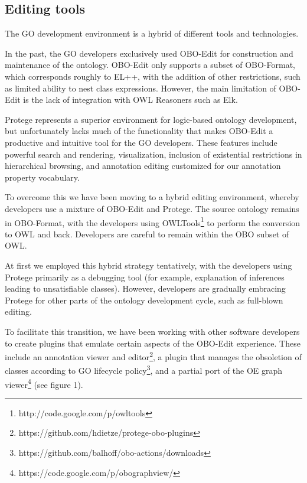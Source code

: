 \documentclass{llncs}
\begin{document}
\subsection{Editing tools}

The GO development environment is a hybrid of different tools and
technologies.

In the past, the GO developers exclusively used
OBO-Edit \cite{Day-Richter2007} for construction and maintenance of the
ontology. OBO-Edit only supports a subset of OBO-Format, which
corresponds roughly to EL++, with the addition of other restrictions,
such as limited ability to nest class expressions. However, the main
limitation of OBO-Edit is the lack of integration with OWL Reasoners
such as Elk.

Protege represents a superior environment for logic-based ontology
development, but unfortunately lacks much of the functionality that
makes OBO-Edit a productive and intuitive tool for the GO
developers. These features include powerful search and rendering,
visualization, inclusion of existential restrictions in hierarchical
browsing, and annotation editing customized for our annotation property vocabulary.


To overcome this we have been moving to a hybrid editing environment,
whereby developers use a mixture of OBO-Edit and Protege. The source
ontology remains in OBO-Format, with the developers using 
OWLTools\footnote{http://code.google.com/p/owltools} to perform the conversion to OWL and
back. Developers are careful to remain within the OBO subset of OWL. 

At first we employed this hybrid strategy tentatively, with the
developers using Protege primarily as a debugging tool (for example,
explanation of inferences leading to unsatisfiable classes). However,
developers are gradually embracing Protege for other parts of the
ontology development cycle, such as full-blown editing.

To facilitate this transition, we have been working with other
software developers to create plugins that emulate certain aspects of
the OBO-Edit experience. These include an annotation viewer and
editor\footnote{https://github.com/hdietze/protege-obo-plugins}, a
plugin that manages the obsoletion of classes according to GO
lifecycle policy\footnote{https://github.com/balhoff/obo-actions/downloads}, and a partial
port of the OE graph
viewer\footnote{https://code.google.com/p/obographview/} (see figure 1).
\end{document}
